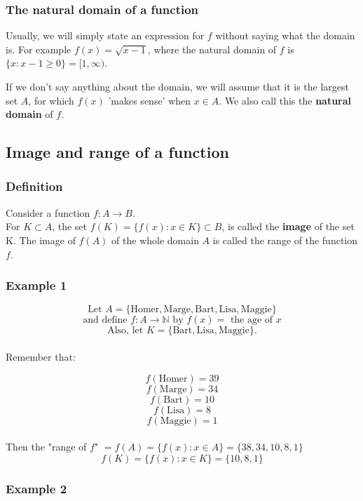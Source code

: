 \documentclass[11pt]{article}
\begin{document}
\subsubsection{The natural domain of a function}
\label{sec:org318bd19}
Usually, we will simply state an expression for \(f\) without saying what the domain is. For example \(f(x) = \sqrt{x-1}\), where the natural domain of \(f\) is \(\{x : x - 1 \ge 0\} = [1, \infty)\).

If we don't say anything about the domain, we will assume that it is the largest set \(A\), for which \(f(x)\) 'makes sense' when \(x \in A\). We also call this the \textbf{natural domain} of \(f\).

\subsection{Image and range of a function}
\label{sec:org0c7fc82}

\subsubsection{Definition}
\label{sec:org3bac71d}
Consider a function \(f : A \rightarrow B\).
\\[0pt]

For \(K \subset A\), the set \(f(K) = \{f(x) : x \in K\} \subset B\), is called the \textbf{image} of the set K. The image of \(f(A)\) of the whole domain \(A\) is called the range of the function \(f\).

\subsubsection{Example 1}
\label{sec:orgb3aff64}
\[\text{Let } A = \{\text{Homer}, \text{Marge}, \text{Bart}, \text{Lisa}, \text{Maggie}\}\]
\[\text{and define } f : A \rightarrow \mathbb{N} \text{ by } f(x) = \text{ the age of } x\]
\[\text{Also, let } K = \{\text{Bart}, \text{Lisa}, \text{Maggie}\}.\]
\\[0pt]

Remember that:

\[f(\text{Homer}) = 39\]
\[f(\text{Marge}) = 34\]
\[f(\text{Bart}) = 10\]
\[f(\text{Lisa}) = 8\]
\[f(\text{Maggie}) = 1\]
\\[0pt]

Then the "range of \(f\)" \(= f(A) = \{f(x) : x \in A\} = \{38, 34, 10, 8, 1\}\)
\[f(K) = \{f(x): x \in K\} = \{10, 8, 1\}\]

\subsubsection{Example 2}
\label{sec:orga3fa213}
\end{document}

